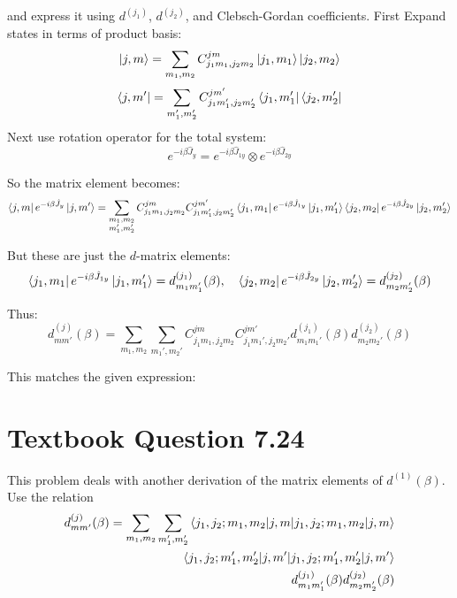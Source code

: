 \documentclass[12pt]{article}
\begin{document}
        and express it using \( d^{(j_1)} \), \( d^{(j_2)} \), and Clebsch-Gordan coefficients. First Expand states in terms of product basis:
        \[
            \ket{j, m} = \sum_{m_1, m_2} C^{j m}_{j_1 m_1, j_2 m_2} \ket{j_1, m_1} \ket{j_2, m_2}
        \]
        \[
            \bra{j, m'} = \sum_{m_1', m_2'} C^{j m'}_{j_1 m_1', j_2 m_2'} \bra{j_1, m_1'} \bra{j_2, m_2'}
        \]
        Next use rotation operator for the total system:
        \[
            e^{-i \beta \hat{J}_y} = e^{-i \beta \hat{J}_{1y}} \otimes e^{-i \beta \hat{J}_{2y}}
        \]

        So the matrix element becomes:
        \[
            \bra{j, m} e^{-i \beta \hat{J}_y} \ket{j, m'} = 
            \sum_{\substack{m_1, m_2 \\ m_1', m_2'}} 
            C^{j m}_{j_1 m_1, j_2 m_2}
            C^{j m'}_{j_1 m_1', j_2 m_2'}
            \bra{j_1, m_1} e^{-i \beta \hat{J}_{1y}} \ket{j_1, m_1'}
            \bra{j_2, m_2} e^{-i \beta \hat{J}_{2y}} \ket{j_2, m_2'}
        \]

        But these are just the \( d \)-matrix elements:
        \[
            \bra{j_1, m_1} e^{-i \beta \hat{J}_{1y}} \ket{j_1, m_1'} = d^{(j_1)}_{m_1 m_1'}(\beta), \quad
            \bra{j_2, m_2} e^{-i \beta \hat{J}_{2y}} \ket{j_2, m_2'} = d^{(j_2)}_{m_2 m_2'}(\beta)
        \]

        Thus:
        \[
            d^{(j)}_{mm'}(\beta) = \sum_{m_1, m_2} \sum_{m_1', m_2'} 
            C^{j m}_{j_1 m_1, j_2 m_2}
            C^{j m'}_{j_1 m_1', j_2 m_2'}
            d^{(j_1)}_{m_1 m_1'}(\beta)
            d^{(j_2)}_{m_2 m_2'}(\beta)
        \]

        This matches the given expression:

\section{Textbook Question 7.24}
    This problem deals with another derivation of the matrix elements of \( d^{(1)}(\beta) \). Use the relation
    \begin{equation}
        \begin{split}
            d^{(j)}_{mm'}(\beta) =
            \sum_{m_1, m_2} \sum_{m_1', m_2'}
            \braket{j_1, j_2; m_1, m_2 | j, m} \\
            \braket{j_1, j_2; m_1', m_2' | j, m'} \\
            d^{(j_1)}_{m_1 m_1'}(\beta)
            d^{(j_2)}_{m_2 m_2'}(\beta)
        \end{split}
    \end{equation}
        
\end{document}
